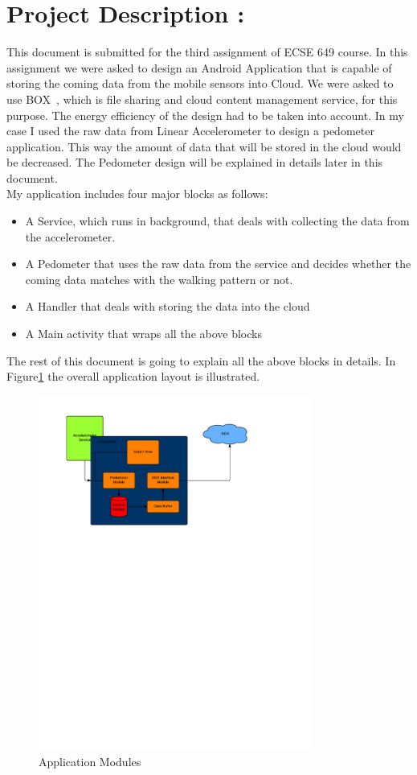 \documentclass[conference]{IEEEtran}
\begin{document}
\section{Project Description :}
This document is submitted for the third assignment of ECSE 649 course.  In this assignment we were asked to design an Android Application that is capable of storing the coming data from the mobile sensors into Cloud. We were asked to use BOX~\cite{BoxAppRef}, which is file sharing and cloud content management service, for this purpose. The energy efficiency of the design had to be taken into account. In my case I used the raw data from Linear Accelerometer to design a pedometer~\cite{PedometerRef} application. This way the amount of data that will be stored in the cloud would be decreased. The Pedometer design will be explained in details later in this document.\\
My application includes four major blocks as follows:\\
\begin{itemize}
  \item A Service, which runs in background, that deals with collecting the data from the accelerometer.
  \item A Pedometer that uses the raw data from the service and decides whether the coming data matches with the walking pattern or not.
  \item A Handler that deals with storing the data into the cloud
  \item A Main activity that wraps all the above blocks
\end{itemize}
The rest of this document is going to explain all the above blocks in details. In Figure\ref{ApplicationModules} the overall application layout is illustrated.
\begin{figure}[H]
\centering
\includegraphics[width=9cm]{OverallApplicatio.pdf}
\caption{\scriptsize  Application Modules}
\label{ApplicationModules}
\end{figure}
\end{document}
